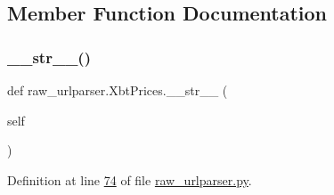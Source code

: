 \subsection{Member Function Documentation}
\mbox{\label{classraw__urlparser_1_1_xbt_prices_a8613d27cac39cc195364ea8de17b9660}} 
\subsubsection{\texorpdfstring{\+\_\+\+\_\+str\+\_\+\+\_\+()}{\_\_str\_\_()}}
{\footnotesize\ttfamily def raw\+\_\+urlparser.\+Xbt\+Prices.\+\_\+\+\_\+str\+\_\+\+\_\+ (\begin{DoxyParamCaption}\item[{}]{self }\end{DoxyParamCaption})}



Definition at line \hyperlink{raw__urlparser_8py_source_l00074}{74} of file \hyperlink{raw__urlparser_8py_source}{raw\+\_\+urlparser.\+py}.



